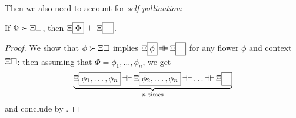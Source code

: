 Then we also need to account for \emph{self-pollination}:

\begin{lemma}[Pollination]
  
  If $\Phi \succ \Xi\square$, then $\Xi\select{\Phi} \kequiv
  \Xi\select{\phantom{\Phi}}$.
\end{lemma}
\begin{proof}
  We show that $\phi \succ \Xi\square$ implies $\Xi\select{\phi} \kequiv
  \Xi\select{\phantom{\phi}}$ for any flower $\phi$ and context $\Xi\square$: then
  assuming that $\Phi = \phi_1, \ldots, \phi_n$, we get
  $$\underbrace{\Xi\select{\phi_1, \ldots, \phi_n} \kequiv \Xi\select{\phi_2,
  \ldots, \phi_n} \kequiv \ldots \kequiv \Xi\select{\phantom{\phi}}}_{\text{$n$
  times}}$$ and conclude by .
  

\end{proof}
